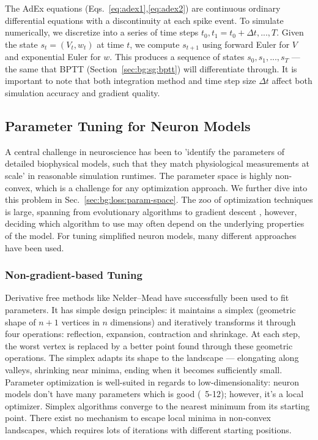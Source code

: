 The \gls{AdEx} equations (Eqs.~\ref{eq:adex1},\ref{eq:adex2}) are continuous ordinary differential equations with a discontinuity at each spike event.
To simulate numerically, we discretize into a series of time steps $t_0, t_1 = t_0 + \Delta t, ..., T$.
Given the state $s_t = (V_t, w_t)$ at time $t$, we compute $s_{t+1}$ using forward Euler for $V$ and exponential Euler for $w$.
This produces a sequence of states $s_0, s_1, ..., s_T$ — the same that \gls{BPTT} (Section~\ref{sec:bg:sg:bptt}) will differentiate through.
It is important to note that both integration method and time step size $\Delta t$ affect both simulation accuracy and gradient quality.

\subsection{Parameter Tuning for Neuron Models}\label{sec:bg:parameter-tuning}
A central challenge in neuroscience has been to 'identify the parameters of detailed biophysical models, such that they match physiological measurements at scale' \cite{Deistler2025} in reasonable simulation runtimes.
The parameter space is highly non-convex, which is a challenge for any optimization approach.
We further dive into this problem in Sec.~\ref{sec:bg:loss:param-space}.
The zoo of optimization techniques is large, spanning from evolutionary algorithms \cite{VanGeit2008} to gradient descent \cite{Jones2024}, however, deciding which algorithm to use may often depend on the underlying properties of the model.
For tuning simplified neuron models, many different approaches have been used.

\subsubsection{Non-gradient-based Tuning}\label{sec:bg:tuning:non-gradient-based}
Derivative free methods like Nelder--Mead have successfully been used to fit parameters.
It has simple design principles: it maintains a simplex (geometric shape of $n+1$ vertices in $n$ dimensions) and iteratively transforms it through four operations:
reflection, expansion, contraction and shrinkage.
At each step, the worst vertex is replaced by a better point found through these geometric operations.
The simplex adapts its shape to the landscape --- elongating along valleys, shrinking near minima, ending when it becomes sufficiently small.
Parameter optimization is well-suited in regards to low-dimensionality: neuron models don't have many parameters which is good (~5-12);
however, it's a local optimizer.
Simplex algorithms converge to the nearest minimum from its starting point.
There exist no mechanism to escape local minima in non-convex landscapes, which requires lots of iterations with different starting positions.

